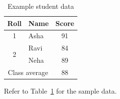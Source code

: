 \documentclass{article}
\begin{document}
\begin{table}[htbp]
\centering
\caption{Example student data}
\label{tab:students}
\begin{tabular}{|c|l|c|}
\hline
\rowcolor{blue!15}
Roll & Name & Score \\
\hline
1 & Asha & 91 \\
\hline
\multirow{2}{*}{2} & Ravi & 84 \\
                   & Neha & 89 \\
\hline
\multicolumn{2}{|c|}{Class average} & 88 \\
\hline
\end{tabular}
\end{table}
Refer to Table~\ref{tab:students} for the sample data.
\end{document}
